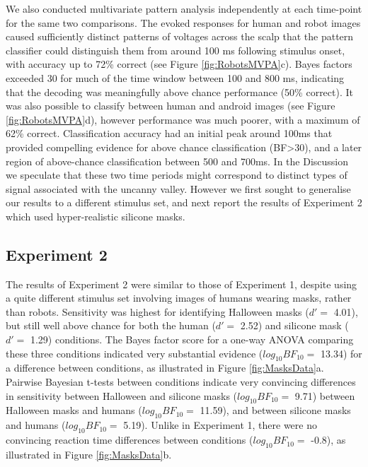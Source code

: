 \documentclass[
]{article}
\begin{document}
We also conducted multivariate pattern analysis independently at each time-point for the same two comparisons. The evoked responses for human and robot images caused sufficiently distinct patterns of voltages across the scalp that the pattern classifier could distinguish them from around 100 ms following stimulus onset, with accuracy up to 72\% correct (see Figure \ref{fig:RobotsMVPA}c). Bayes factors exceeded 30 for much of the time window between 100 and 800 ms, indicating that the decoding was meaningfully above chance performance (50\% correct). It was also possible to classify between human and android images (see Figure \ref{fig:RobotsMVPA}d), however performance was much poorer, with a maximum of 62\% correct. Classification accuracy had an initial peak around 100ms that provided compelling evidence for above chance classification (BF\textgreater30), and a later region of above-chance classification between 500 and 700ms. In the Discussion we speculate that these two time periods might correspond to distinct types of signal associated with the uncanny valley. However we first sought to generalise our results to a different stimulus set, and next report the results of Experiment 2 which used hyper-realistic silicone masks.

\hypertarget{experiment-2}{%
\subsection{Experiment 2}\label{experiment-2}}

The results of Experiment 2 were similar to those of Experiment 1, despite using a quite different stimulus set involving images of humans wearing masks, rather than robots. Sensitivity was highest for identifying Halloween masks (\(d' =\) 4.01), but still well above chance for both the human (\(d' =\) 2.52) and silicone mask (\(d' =\) 1.29) conditions. The Bayes factor score for a one-way ANOVA comparing these three conditions indicated very substantial evidence (\(log_{10}BF_{10} =\) 13.34) for a difference between conditions, as illustrated in Figure \ref{fig:MasksData}a. Pairwise Bayesian t-tests between conditions indicate very convincing differences in sensitivity between Halloween and silicone masks (\(log_{10}BF_{10} =\) 9.71) between Halloween masks and humans (\(log_{10}BF_{10} =\) 11.59), and between silicone masks and humans (\(log_{10}BF_{10} =\) 5.19). Unlike in Experiment 1, there were no convincing reaction time differences between conditions (\(log_{10}BF_{10} =\) -0.8), as illustrated in Figure \ref{fig:MasksData}b.
\end{document}
